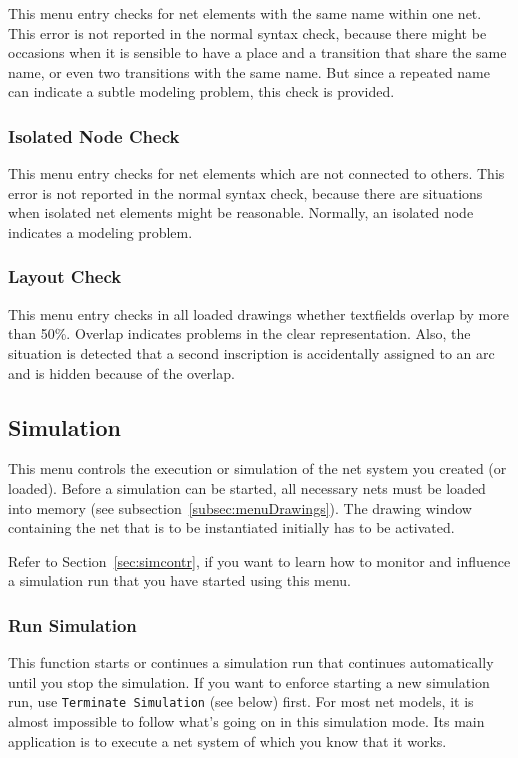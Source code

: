 This menu entry checks for net elements with the same
name within one net. This error is not reported
in the normal syntax check, because there might be occasions
when it is sensible to have a place and a transition that share
the same name, or even two transitions with the same name.
But since a repeated name can indicate a subtle modeling
problem, this check is provided.


\subsubsection{Isolated Node Check}

This menu entry checks for net elements which are not
connected to others.  This error is not reported in the normal syntax
check, because there are situations when isolated net elements might be
reasonable.  Normally, an isolated node indicates a modeling
problem.
\fi

\subsubsection{Layout Check}

This menu entry checks in all loaded drawings whether
textfields overlap by more than 50\%.  Overlap indicates problems in the
clear representation. Also, the situation is detected that a second
inscription is accidentally assigned to an arc and is hidden because of the
overlap.


\subsection{Simulation}
\label{sec:simulation}

This menu controls the execution or simulation of the net system
you created (or loaded).
Before a simulation can be started, all necessary nets must be loaded into
memory (see subsection~\ref{subsec:menuDrawings}).
The drawing window containing the net that is to be
instantiated initially has to be activated.

Refer to Section~\ref{sec:simcontr}, if you want to learn how to
monitor and influence a simulation run
that you have started using this menu.

\subsubsection{Run Simulation}

This function starts or continues a simulation run that continues
automatically until you stop the simulation.
If you want to enforce starting a new simulation run, use
\texttt{Terminate Simulation} (see below) first.
For most net models, it is almost impossible to follow what's going
on in this simulation mode. Its main application is to execute a
net system of which you know that it works.

